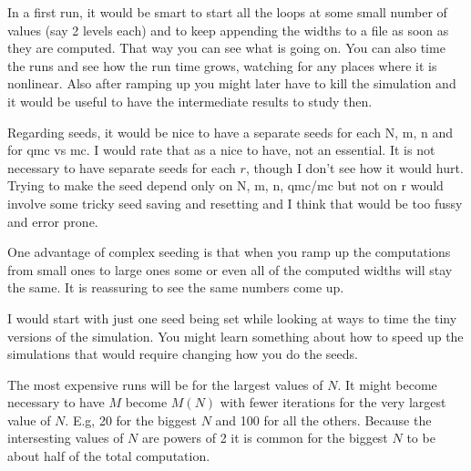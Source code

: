 \documentclass{article}
\begin{document}
In a first run, it would be smart to start all the
loops at some small number of values (say 2 levels each)
and to keep appending the widths to a file as soon 
as they are computed. That way
you can see what is going on. You can also time
the runs and see how the run time grows, watching
for any places where it is nonlinear. Also after ramping
up you might later have to kill the simulation and
it would be useful to have the intermediate results
to study then.

Regarding seeds, it would be nice to have a separate
seeds for each N, m, n and for qmc vs mc.  I would
rate that as a nice to have, not an essential.  It is
not necessary to have separate seeds for each $r$, 
though I don't see how it would hurt.  Trying to make
the seed depend only on N, m, n, qmc/mc but not on r
would involve some tricky seed saving and resetting
and I think that would be too fussy and error prone.

One advantage of complex seeding is that when you
ramp up the computations from small ones to large
ones some or even all of the computed widths
will stay the same.  It is reassuring to see the
same numbers come up. 

I would start with just one seed being set while
looking at ways to time the tiny versions of the
simulation.  You might learn something about how
to speed up the simulations that would require
changing how you do the seeds.

The most expensive runs will be for the largest
values of $N$.  It might become necessary to have
$M$ become $M(N)$ with fewer iterations for the
very largest value of $N$. E.g, 20 for the biggest
$N$ and 100 for all the others.  Because the intersesting
values of $N$ are powers of 2 it is common for the
biggest $N$ to be about half of the total computation.
\end{document}
